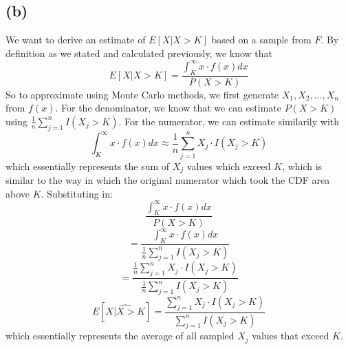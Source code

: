 \documentclass{article}
\begin{document}
{\subsection*{(b)}

We want to derive an estimate of \(E[X | X > K]\) based on a sample from \(F\).
By definition as we stated and calculated previously, we know that
\[
  E[X | X > K] = \frac{\int_K^{\infty}x \cdot f(x) dx}{P(X > K)}
\]
So to approximate using Monte Carlo methods, we first generate \(X_1, X_2, \dots, X_n\) from \(f(x)\). For the denominator, we know that we can estimate \(P(X > K)\) using \(\frac{1}{n} \sum_{j=1}^{n} I(X_j > K)\). For the numerator, we can estimate similarily with 
\[
  \int_K^{\infty}x \cdot f(x) dx \approx \frac{1}{n} \sum_{j=1}^{n} X_j \cdot I(X_j > K)
\]
which essentially represents the sum of \(X_j\) values which exceed \(K\), which is similar to the way in which the original numerator which took the CDF area above \(K\). Substituting in:
\[
  \frac{\int_K^{\infty}x \cdot f(x) dx}{P(X > K)}
\]
\[
  = \frac{\int_K^{\infty}x \cdot f(x) dx}{\frac{1}{n} \sum_{j=1}^{n} I(X_j > K)}
\]
\[
  = \frac{\frac{1}{n} \sum_{j=1}^{n} X_j \cdot I(X_j > K)}{\frac{1}{n} \sum_{j=1}^{n} I(X_j > K)}
\]
\[
  \boxed{E[\widehat{X | X > K}] = \frac{\sum_{j=1}^{n} X_j \cdot I(X_j > K)}{\sum_{j=1}^{n} I(X_j > K)}}
\]
which essentially represents the average of all sampled \(X_j\) values that exceed \(K\).

}
\end{document}
